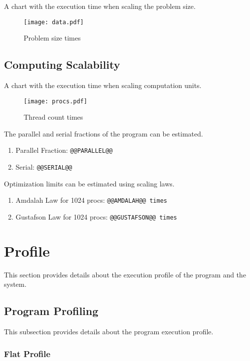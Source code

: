 \documentclass[a4paper]{article}
\begin{document}
A chart with the execution time when scaling the problem size.

\begin{figure}[H]
\label{fig:scaling}
\centering
\texttt{[image: data.pdf]}
\caption{Problem size times}
\end{figure}

\subsection{Computing Scalability}

A chart with the execution time when scaling computation units.

\begin{figure}[H]
\label{fig:threads}
\centering
\texttt{[image: procs.pdf]}
\caption{Thread count times}
\end{figure}

The parallel and serial fractions of the program can be estimated.

\begin{enumerate}
\item Parallel Fraction: {\tt @@PARALLEL@@}
\item Serial: {\tt @@SERIAL@@}
\end{enumerate}

Optimization limits can be estimated using scaling laws.

\begin{enumerate}
\item Amdalah Law for 1024 procs: {\tt @@AMDALAH@@ times}
\item Gustafson Law for 1024 procs: {\tt @@GUSTAFSON@@ times}
\end{enumerate}

\section{Profile}

This section provides details about the execution profile of the program and the system.

\subsection{Program Profiling}

This subsection provides details about the program execution profile.


\subsubsection{Flat Profile}
\end{document}
